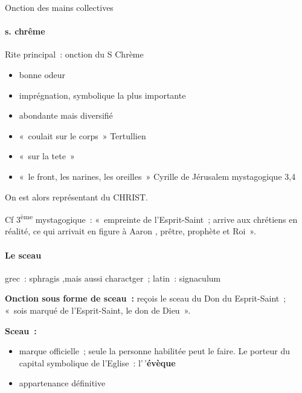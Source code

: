 Onction des mains collectives

\hypertarget{b.-s.-chruxeame}{%
\paragraph{s. chrême}\label{b.-s.-chruxeame}}

Rite principal~: onction du S Chrème

\begin{itemize}
\item
  bonne odeur
\item
  imprégnation, symbolique la plus importante
\item
  abondante mais diversifié
\item
   
  «~coulait sur le corps~» Tertullien
   
\item
   
  «~sur la tete~»
   
\item
   
  «~le front, les narines, les oreilles~» Cyrille de Jérusalem
  mystagogique 3,4
   
\end{itemize}

On est alors représentant du CHRIST.

Cf 3\textsuperscript{ème} mystagogique~: «~empreinte de l'Esprit-Saint~;
arrive aux chrétiens en réalité, ce qui arrivait en figure à Aaron ,
prêtre, prophète et Roi~».

\hypertarget{c.-le-sceau}{%
\paragraph{Le sceau}\label{c.-le-sceau}}

grec~: sphragis ,mais aussi charactger~; latin~: signaculum

\textbf{Onction sous forme de sceau~:} reçois le sceau du Don du
Esprit-Saint~; «~sois marqué de l'Esprit-Saint, le don de Dieu~».

\textbf{Sceau~:}

\begin{itemize}
\item
  marque officielle~; seule la personne habilitée peut le faire. Le
  porteur du capital symbolique de l'Eglise~: l'\,'\textbf{évèque}
\item
  appartenance définitive
\end{itemize}


